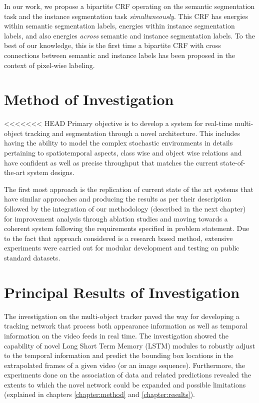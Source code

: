 In our work, we propose a bipartite CRF operating on the semantic segmentation task and the instance segmentation task \emph{simultaneously}. This CRF has energies within semantic segmentation labels, energies within instance segmentation labels, and also energies \emph{across} semantic and instance segmentation labels. To the best of our knowledge, this is the first time a bipartite CRF with cross connections between semantic and instance labels has been proposed in the context of pixel-wise labeling.

\section{Method of Investigation}
<<<<<<< HEAD
 Primary objective is to develop a system for real-time multi-object tracking and segmentation through a novel architecture. This includes having the ability to model the complex stochastic environments in details pertaining to spatiotemporal aspects, class wise and object wise relations and have confident as well as precise throughput that matches the current state-of-the-art system designs. 
 
 The first most approach is the replication of current state of the art systems that have similar approaches and producing the results as per their description followed by the integration of our methodology (described in the next chapter) for improvement analysis through ablation studies and moving towards a coherent system following the requirements specified in problem statement. Due to the fact that approach considered is a research based method, extensive experiments were carried out for modular development and testing on public standard datasets. 
 
 
\section{Principal Results of Investigation}
The investigation on the multi-object tracker paved the way for developing a tracking network that process both appearance information as well as temporal information on the video feeds in real time. The investigation showed the capability of novel Long Short Term Memory (LSTM) modules to robustly adjust to the temporal information and predict the bounding box locations in the extrapolated frames of a given video (or an image sequence). Furthermore, the experiments done on the association of data and related predictions revealed the extents to which the novel network could be expanded and possible limitations (explained in chapters \ref{chapter:method} and \ref{chapter:results}).

